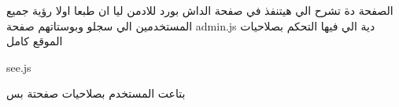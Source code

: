 الصفحة دة تشرح الي هيتنفذ في صفحة الداش بورد للادمن ليا ان طبعا
اولا رؤية جميع المستخدمين الي سجلو وبوستاتهم 
صفحة admin.js
{
    دية الي فيها التحكم بصلاحيات الموقع كامل
}

 see.js
 {
    بتاعت المستخدم بصلاحيات صفحتة بس

 }
 